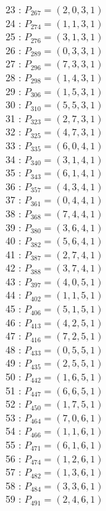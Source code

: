 \documentclass{article}
\begin{document}
{\begin{multicols}{3}
23 : $P_{267}=( 2, 0, 3, 1 )$\\
24 : $P_{274}=( 1, 1, 3, 1 )$\\
25 : $P_{276}=( 3, 1, 3, 1 )$\\
26 : $P_{289}=( 0, 3, 3, 1 )$\\
27 : $P_{296}=( 7, 3, 3, 1 )$\\
28 : $P_{298}=( 1, 4, 3, 1 )$\\
29 : $P_{306}=( 1, 5, 3, 1 )$\\
30 : $P_{310}=( 5, 5, 3, 1 )$\\
31 : $P_{323}=( 2, 7, 3, 1 )$\\
32 : $P_{325}=( 4, 7, 3, 1 )$\\
33 : $P_{335}=( 6, 0, 4, 1 )$\\
34 : $P_{340}=( 3, 1, 4, 1 )$\\
35 : $P_{343}=( 6, 1, 4, 1 )$\\
36 : $P_{357}=( 4, 3, 4, 1 )$\\
37 : $P_{361}=( 0, 4, 4, 1 )$\\
38 : $P_{368}=( 7, 4, 4, 1 )$\\
39 : $P_{380}=( 3, 6, 4, 1 )$\\
40 : $P_{382}=( 5, 6, 4, 1 )$\\
41 : $P_{387}=( 2, 7, 4, 1 )$\\
42 : $P_{388}=( 3, 7, 4, 1 )$\\
43 : $P_{397}=( 4, 0, 5, 1 )$\\
44 : $P_{402}=( 1, 1, 5, 1 )$\\
45 : $P_{406}=( 5, 1, 5, 1 )$\\
46 : $P_{413}=( 4, 2, 5, 1 )$\\
47 : $P_{416}=( 7, 2, 5, 1 )$\\
48 : $P_{433}=( 0, 5, 5, 1 )$\\
49 : $P_{435}=( 2, 5, 5, 1 )$\\
50 : $P_{442}=( 1, 6, 5, 1 )$\\
51 : $P_{447}=( 6, 6, 5, 1 )$\\
52 : $P_{450}=( 1, 7, 5, 1 )$\\
53 : $P_{464}=( 7, 0, 6, 1 )$\\
54 : $P_{466}=( 1, 1, 6, 1 )$\\
55 : $P_{471}=( 6, 1, 6, 1 )$\\
56 : $P_{474}=( 1, 2, 6, 1 )$\\
57 : $P_{482}=( 1, 3, 6, 1 )$\\
58 : $P_{484}=( 3, 3, 6, 1 )$\\
59 : $P_{491}=( 2, 4, 6, 1 )$\\

\end{multicols}}
\end{document}
